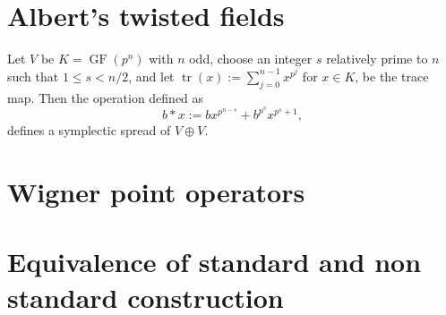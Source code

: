 \documentclass[a4paper, 11pt]{article}
\DeclareMathOperator{\GF}{GF}
\DeclareMathOperator{\tr}{tr}
\begin{document}
  \section{Albert's twisted fields}

  Let $V$ be $K = \GF(p^{n})$ with $n$ odd, choose an
  integer $s$ relatively prime to $n$ such that $1 \leq s <
  n / 2$, and let $\tr(x) := \sum_{j=0}^{n-1} x^{p^{j}}$ for
  $x \in K$, be the trace map. Then the operation defined as
  \begin{equation}
    b * x := bx^{p^{n-s}} + b^{p^{s}} x^{p^{s}+1},
  \end{equation}
  defines a symplectic spread of $V \oplus V$.

  \section{Wigner point operators}

  \section{Equivalence of standard and non standard
  construction}
\end{document}
